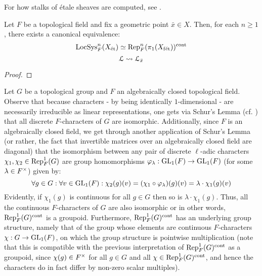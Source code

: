         \begin{remark}
            For how stalks of \'etale sheaves are computed, see \cite[\href{https://stacks.math.columbia.edu/tag/03PN}{Tag 03PN}]{stacks}.
        \end{remark}
        \begin{lemma} \label{lemma: representations_of_the_etale_fundamental_group}
            Let $F$ be a topological field and fix a geometric point $\bar{x} \in X$. Then, for each $n \geq 1$, there exists a canonical equivalence:
                $$\mathrm{LocSys}_F^n(X_{\mathrm{\acute{e}t}}) \simeq \mathrm{Rep}_F^n(\pi_1(X_{\mathrm{f\acute{e}t}}))^{\mathrm{cont}}$$
                $$\mathcal{L} \leadsto \mathcal{L}_{\bar{x}}$$
        \end{lemma}
            \begin{proof}
                
            \end{proof}
        \begin{remark} \label{remark: groupoids_of_characters}
            Let $G$ be a topological group and $F$ an algebraically closed topological field. Observe that because characters - by being identically $1$-dimensional - are necessarily irreducible as linear representations, one gets via Schur's Lemma (cf. \cite[Lemma 3.6, pp. 35]{lam_first_course_in_noncommutative_rings}) that all discrete $F$-characters of $G$ are isomorphic. Additionally, since $F$ is an algebraically closed field, we get through another application of Schur's Lemma (or rather, the fact that invertible matrices over an algebraically closed field are diagonal) that the isomorphism between any pair of discrete $\ell$-adic characters $\chi_1, \chi_2 \in \mathrm{Rep}^1_F(G)$ are group homomorphisms $\varphi_{\lambda}: \operatorname{GL}_1(F) \to \operatorname{GL}_1(F)$ (for some $\lambda \in F^{\x}$) given by:
                $$\forall g \in G: \forall v \in \operatorname{GL}_1(F): \chi_2(g)(v) = (\chi_1 \circ \varphi_{\lambda})(g)(v) = \lambda \cdot \chi_1(g)(v)$$
            Evidently, if $\chi_1(g)$ is continuous for all $g \in G$ then so is $\lambda \cdot \chi_1(g)$. Thus, all the continuous $F$-characters of $G$ are also isomorphic or in other words, $\mathrm{Rep}^1_F(G)^{\mathrm{cont}}$ is a groupoid. Furthermore, $\mathrm{Rep}^1_F(G)^{\mathrm{cont}}$ has an underlying group structure, namely that of the group whose elements are continuous $F$-characters $\chi: G \to \operatorname{GL}_1(F)$, on which the group structure is pointwise multiplication (note that this is compatible with the previous interpretation of $\mathrm{Rep}^1_F(G)^{\mathrm{cont}}$ as a groupoid, since $\chi(g) \in F^{\x}$ for all $g \in G$ and all $\chi \in \mathrm{Rep}^1_F(G)^{\mathrm{cont}}$, and hence the characters do in fact differ by non-zero scalar multiples).
        \end{remark}
